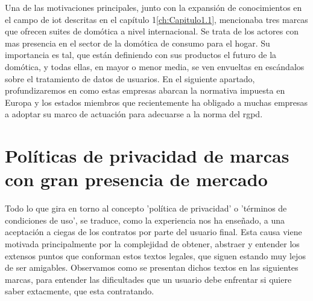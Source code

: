 \vspace{1cm}

Una de las motivaciones principales, junto con la expansión de conocimientos en el campo de \gls{iot}  descritas en el capítulo 1\ref{ch:Capitulo1.1}, mencionaba tres marcas que ofrecen suites de domótica a nivel internacional. Se trata de los actores con mas presencia en el sector de la domótica de consumo para el hogar. Su importancia es tal, que están definiendo con sus productos el futuro de la domótica, y todas ellas, en mayor o menor media, se ven envueltas en escándalos sobre el tratamiento de datos de usuarios. En el siguiente apartado, profundizaremos en como estas empresas abarcan la normativa impuesta en Europa y los estados miembros que recientemente ha obligado a muchas empresas a adoptar su marco de actuación para adecuarse a la norma del \gls{rgpd}.

\section{Políticas de privacidad de marcas con gran presencia de mercado}
\label{ch:Capitulo2.1}

Todo lo que gira en torno al concepto 'política de privacidad' o 'términos de condiciones de uso', se traduce, como la experiencia nos ha enseñado, a una aceptación a ciegas de los contratos por parte del usuario final. Esta causa viene motivada principalmente por la complejidad de obtener, abstraer y entender los extensos puntos que conforman estos textos legales, que siguen estando muy lejos de ser amigables. Observamos como se presentan dichos textos en las siguientes marcas, para entender las dificultades que un usuario debe enfrentar si quiere saber extacmente, que esta contratando.

\vspace{1.5cm}

